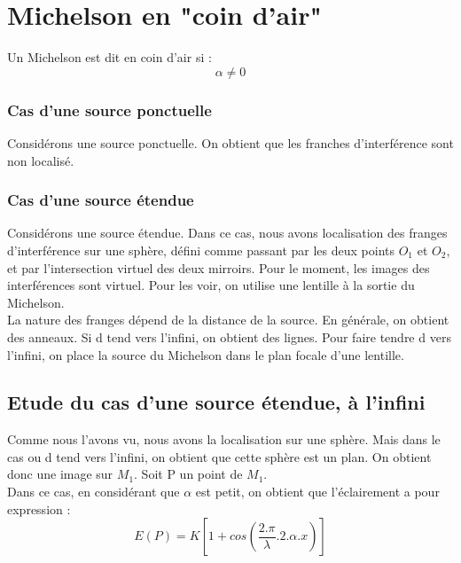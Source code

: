 \section{Michelson en "coin d'air"}
\begin{de}
Un Michelson est dit en coin d'air si :
$$\alpha \neq 0$$
\end{de}
\subsubsection{Cas d'une source ponctuelle}
Considérons une source ponctuelle. On obtient que les franches d'interférence sont non localisé.
\subsubsection{Cas d'une source étendue}
Considérons une source étendue. Dans ce cas, nous avons localisation des franges d'interférence sur une sphère, défini comme passant par les deux points $O_1$ et $O_2$, et par l'intersection virtuel des deux mirroirs. Pour le moment, les images des interférences sont virtuel. Pour les voir, on utilise une lentille à la sortie du Michelson.\\
La nature des franges dépend de la distance de la source. En générale, on obtient des anneaux. Si d tend vers l'infini, on obtient des lignes. Pour faire tendre d vers l'infini, on place la source du Michelson dans le plan focale d'une lentille.
\subsection{Etude du cas d'une source étendue, à l'infini}
Comme nous l'avons vu, nous avons la localisation sur une sphère. Mais dans le cas ou d tend vers l'infini, on obtient que cette sphère est un plan. On obtient donc une image sur $M_1$. Soit P un point de $M_1$.\\
Dans ce cas, en considérant que $\alpha$ est petit, on obtient que l'éclairement a pour expression :
$$E(P) = K[1 + cos(\dfrac{2.\pi}{\lambda}.2.\alpha.x)]$$
